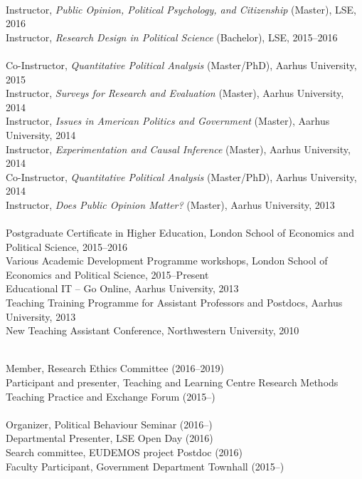 \documentclass[12pt]{article}
\renewcommand{\section}[1]{\pagebreak[3]%
    \llap{\scshape\smash{\parbox[t]{\marginparwidth}{\raggedright {\color{lg}#1}}}}%
    \vspace{-\baselineskip}\par}
\newcommand{\topic}[1]{\pagebreak[3]\indent {\color{lg}{\footnotesize #1 }}\\}
\newcommand{\entry}[1]{\indent {\color{lg}\guillemotright}\hspace{2pt}#1\vspace{.25em}\\}
\begin{document}
\section{Teaching and Advising}
\topic{Experience: London School of Economics and Political Science}
\entry{Instructor, {\em Public Opinion, Political Psychology, and Citizenship} (Master), LSE, 2016}
\entry{Instructor, {\em Research Design in Political Science} (Bachelor), LSE, 2015--2016}
\topic{Experience: Aarhus University}
\entry{Co-Instructor, {\em Quantitative Political Analysis} (Master/PhD), Aarhus University, 2015}
\entry{Instructor, {\em Surveys for Research and Evaluation} (Master), Aarhus University, 2014}
\entry{Instructor, {\em Issues in American Politics and Government} (Master), Aarhus University, 2014}
\entry{Instructor, {\em Experimentation and Causal Inference} (Master), Aarhus University, 2014}
\entry{Co-Instructor, {\em Quantitative Political Analysis} (Master/PhD), Aarhus University, 2014}
\entry{Instructor, {\em Does Public Opinion Matter?} (Master), Aarhus University, 2013}

\topic{Pedagogical Training}
\entry{Postgraduate Certificate in Higher Education, London School of Economics and Political Science, 2015--2016}
\entry{Various Academic Development Programme workshops, London School of Economics and Political Science, 2015--Present}
\entry{Educational IT -- Go Online, Aarhus University, 2013}
\entry{Teaching Training Programme for Assistant Professors and Postdocs, Aarhus University, 2013}
\entry{New Teaching Assistant Conference, Northwestern University, 2010}

\section{Service}
\topic{Institutional (London School of Economics and Political Science)}
	\entry{Member, Research Ethics Committee (2016--2019)}
	\entry{Participant and presenter, Teaching and Learning Centre Research Methods Teaching Practice and Exchange Forum (2015--)}
\topic{Departmental (London School of Economics and Political Science)}
	\entry{Organizer, Political Behaviour Seminar (2016--)}
	\entry{Departmental Presenter, LSE Open Day (2016)}
	\entry{Search committee, EUDEMOS project Postdoc (2016)}
	\entry{Faculty Participant, Government Department Townhall (2015--)}
\end{document}

